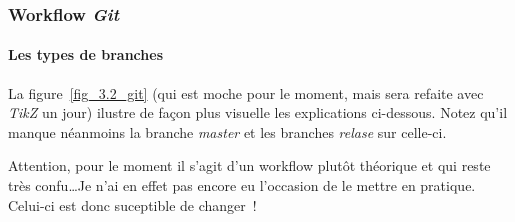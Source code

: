 \subsubsection{Workflow \emph{Git}}

\paragraph{Les types de branches}
La figure~\ref{fig_3.2_git} (qui est moche pour le moment, mais sera refaite avec \emph{TikZ} un jour) ilustre de façon plus visuelle les explications ci-dessous.
Notez qu'il manque néanmoins la branche \emph{master} et les branches \emph{relase} sur celle-ci.

Attention, pour le moment il s'agit d'un workflow plutôt théorique et qui reste très confu\dots Je n'ai en effet pas encore eu l'occasion de le mettre en pratique. Celui-ci est donc suceptible de changer~!

